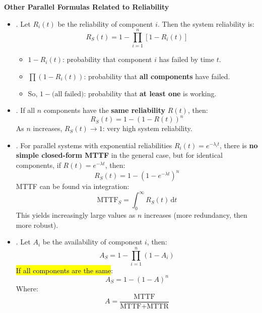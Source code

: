 \begin{flushleft}
    \textcolor{Green3}{ \textbf{Other Parallel Formulas Related to Reliability}}
\end{flushleft}
\begin{itemize}
    \item {}. Let $R_{i}(t)$ be the reliability of component $i$. Then the system reliability is:
    \begin{equation*}
        R_S(t) = 1 - \displaystyle\prod_{i=1}^{n} \left[1 - R_i(t)\right]
    \end{equation*}
    \begin{itemize}
        \item $1 - R_i(t)$: probability that component $i$ has failed by time $t$.
        \item $\prod (1 - R_i(t))$: probability that \textbf{all components} have failed.
        \item So, $1 - \text{(all failed)}$: probability that \textbf{at least one} is working.
    \end{itemize}


    \item {}. If all $n$ components have the \textbf{same reliability} $R(t)$, then:
    \begin{equation}
        R_S(t) = 1 - \left(1 - R\left(t\right)\right)^{n}
    \end{equation}
    As $n$ increases, $R_S(t) \to 1$: very high system reliability.


    \item {}. For parallel systems with exponential reliabilities $R_i(t) = e^{-\lambda_{i} t}$, there is \textbf{no simple closed-form MTTF} in the general case, but for identical components, if $R(t) = e^{-\lambda t}$, then:
    \begin{equation}
        R_S(t) = 1 - \left(1 - e^{-\lambda t}\right)^{n}
    \end{equation}
    MTTF can be found via integration:
    \begin{equation}
        \text{MTTF}_S = \displaystyle\int_{0}^{\infty} R_S(t) \, \mathrm{d}t
    \end{equation}
    This yields increasingly large values as $n$ increases (more redundancy, then more robust).


    \item {}. Let $A_i$ be the availability of component $i$, then:
    \begin{equation}
        A_{S} = 1 - \displaystyle\prod_{i=1}^n \left(1 - A_{i}\right)
    \end{equation}
    \hl{If all components are the same}:
    \begin{equation}
        A_{S} = 1 - \left(1 - A\right)^{n}
    \end{equation}
    Where:
    \begin{equation}
        A = \frac{\text{MTTF}}{\text{MTTF} + \text{MTTR}}
    \end{equation}
\end{itemize}

